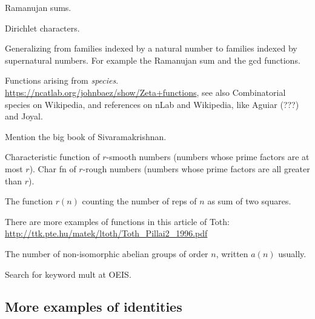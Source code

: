 Ramanujan sums.

Dirichlet characters.

Generalizing from families indexed by a natural number to families indexed by supernatural numbers. For example the Ramanujan sum and the gcd functions.

Functions arising from \emph{species}. \url{https://ncatlab.org/johnbaez/show/Zeta+functions}, see also Combinatorial species on Wikipedia, and references on nLab and Wikipedia, like Aguiar (???) and Joyal. 

Mention the big book of Sivaramakrishnan.

Characteristic function of $r$-smooth numbers (numbers whose prime factors are at most $r$). Char fn of $r$-rough numbers (numbers whose prime factors are all greater than $r$).

The function $r(n)$ counting the number of reps of $n$ as sum of two squares.

There are more examples of functions in this article of Toth: \url{http://ttk.pte.hu/matek/ltoth/Toth_Pillai2_1996.pdf}

The number of non-isomorphic abelian groups of order $n$, written $a(n)$ usually.

Search for keyword mult at OEIS.

\subsection{More examples of identities}

